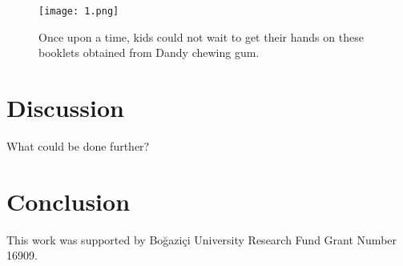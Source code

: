 \documentclass[
]{ceurart}
\begin{document}
\begin{figure}[tbh]
\centering
\texttt{[image: 1.png]}
\caption{Once upon a time, kids could not wait to get their hands on these booklets obtained from Dandy chewing gum.}
\label{fig:demo-fig}
\end{figure}

\section{Discussion}

What could be done further?

\section{Conclusion}

\begin{acknowledgments}
This work was supported by Boğaziçi University Research Fund Grant Number 16909.
\end{acknowledgments}


\end{document}
